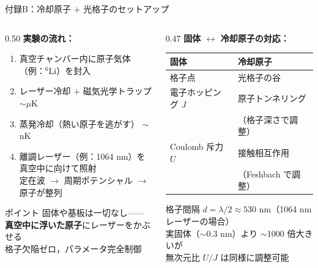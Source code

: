 \documentclass[12pt,aspectratio=169]{beamer}
\begin{document}
\begin{frame}[shrink=5]{付録B：冷却原子 $+$ 光格子のセットアップ}
  \begin{columns}[T]
    \begin{column}{0.50\textwidth}
      \textbf{実験の流れ：}
      {\small
      \begin{enumerate}\itemsep2pt
        \item 真空チャンバー内に原子気体（例：$^6$Li）を封入
        \item レーザー冷却 $+$ 磁気光学トラップ \hfill $\sim\mu$K
        \item 蒸発冷却（熱い原子を逃がす） \hfill $\sim$nK
        \item 離調レーザー（例：1064 nm）を真空中に向けて照射\\
              定在波 $\to$ 周期ポテンシャル $\to$ 原子が整列
      \end{enumerate}
      }

      \smallskip
      \begin{alertblock}{\small ポイント}
        \small
        固体や基板は一切なし——\\
        \textbf{真空中に浮いた原子}にレーザーをかぶせる\\
        格子欠陥ゼロ，パラメータ完全制御
      \end{alertblock}
    \end{column}

    \begin{column}{0.47\textwidth}
      \textbf{固体 $\leftrightarrow$ 冷却原子の対応：}
      \smallskip

      {\small
      \begin{tabular}{ll}
        \hline
        \textbf{固体} & \textbf{冷却原子} \\
        \hline
        格子点 & 光格子の谷 \\
        電子ホッピング $J$ & 原子トンネリング \\
        & （格子深さで調整）\\
        Coulomb 斥力 $U$ & 接触相互作用 \\
        & （Feshbach で調整）\\
        \hline
      \end{tabular}
      }

      \smallskip
      \begin{block}{\small 格子間隔}
        \small
        $d = \lambda/2 \approx 530$ nm（1064 nm レーザーの場合）\\
        実固体（$\sim$0.3 nm）より $\sim$1000 倍大きいが\\
        無次元比 $U/J$ は同様に調整可能
      \end{block}
    \end{column}
  \end{columns}
\end{frame}
\end{document}
